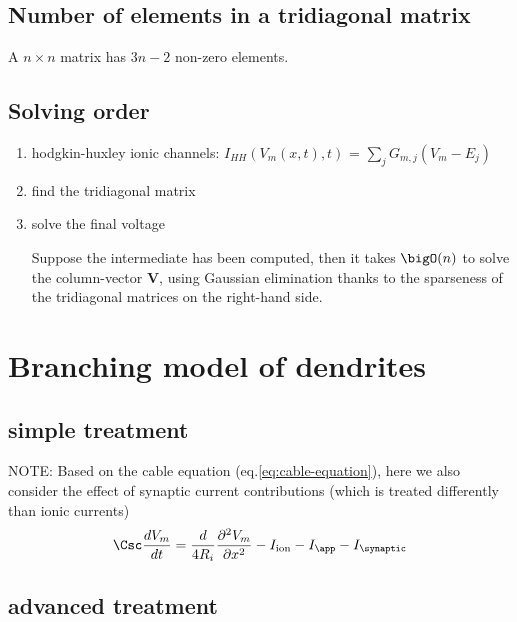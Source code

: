 \subsection{Number of elements in a tridiagonal matrix}

A $n \times n$ matrix has $3n-2$ non-zero elements.

\subsection{Solving order}
\label{sec:solve-oder}

\begin{enumerate}
  \item hodgkin-huxley ionic channels: 
  $I_{HH}(V_m(x,t),t)$ = $\sum_j G_{m,j}(V_m - E_j)$
  
  \item find the tridiagonal matrix
  
  \item solve the final voltage 

Suppose the intermediate has been computed, then it takes $\bigO(n)$ to solve
the column-vector $\mathbf{V}$, using Gaussian elimination thanks to the
sparseness of the tridiagonal matrices on the right-hand side.
\end{enumerate}


\section{Branching model of dendrites}
\label{sec:model-dendrite}

\subsection{simple treatment}

NOTE: Based on the cable equation (eq.\ref{eq:cable-equation}), here we also
consider the effect of synaptic current contributions (which is treated
differently than ionic currents)
\begin{equation}
\Csc \frac{dV_m}{dt} = \frac{d}{4R_i} \frac{\partial^2 V_m}{\partial
x^2} -I_\ion - I_\app - I_\synaptic
\end{equation}

\subsection{advanced treatment}

